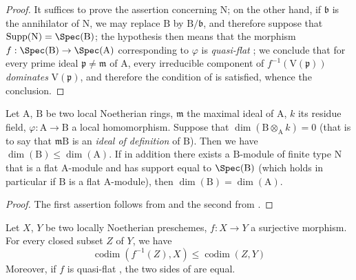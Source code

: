 \begin{proof}
It suffices to prove the assertion concerning $\mathrm{N}$; on the other hand, if $\mathfrak{b}$ is the annihilator of $\mathrm{N}$, we may replace $\mathrm{B}$ by $\mathrm{B}/\mathfrak{b}$, and therefore suppose that $\operatorname{Supp}(\mathrm{N})=\Spec(\mathrm{B})$; the hypothesis then means that the morphism $f:\Spec(\mathrm{B})\to\Spec(\mathrm{A})$ corresponding to $\varphi$ is \emph{quasi-flat} ; we conclude  that for every prime ideal $\mathfrak{p}\neq\mathfrak{m}$ of $\mathrm{A}$,
every irreducible component of $f^{-1}(\mathrm{V}(\mathfrak{p}))$ \emph{dominates} $\mathrm{V}(\mathfrak{p})$, and therefore the condition of  is satisfied, whence the conclusion.
\end{proof}

\begin{corollary}[6.1.3]
\label{IV.6.1.3}
Let $\mathrm{A}$, $\mathrm{B}$ be two local Noetherian rings, $\mathfrak{m}$ the maximal ideal of $\mathrm{A}$, $k$ its residue field, $\varphi:\mathrm{A}\to\mathrm{B}$ a local homomorphism.
Suppose that $\dim(\mathrm{B}\otimes_\mathrm{A} k)=0$ (that is to say  that $\mathfrak{m}\mathrm{B}$ is an \emph{ideal of definition} of $\mathrm{B}$).
Then we have $\dim(\mathrm{B})\leqslant\dim(\mathrm{A})$.
If in addition there exists a $\mathrm{B}$-module of finite type $\mathrm{N}$ that is a flat $\mathrm{A}$-module and has support equal to $\Spec(\mathrm{B})$ (which holds in particular if $\mathrm{B}$ is a flat $\mathrm{A}$-module), then $\dim(\mathrm{B})=\dim(\mathrm{A})$.
\end{corollary}

\begin{proof}
The first assertion follows from  and the second from .
\end{proof}

\begin{corollary}[6.1.4]
\label{IV.6.1.4}
Let $X$, $Y$ be two locally Noetherian preschemes, $f:X\to Y$ a surjective morphism.
For every closed subset $Z$ of $Y$, we have
\begin{equation}
  \operatorname{codim}(f^{-1}(Z),X)\leqslant\operatorname{codim}(Z,Y)
  \tag{6.1.4.1}
\end{equation}
Moreover, if $f$ is quasi-flat , the two sides of  are equal.
\end{corollary}

